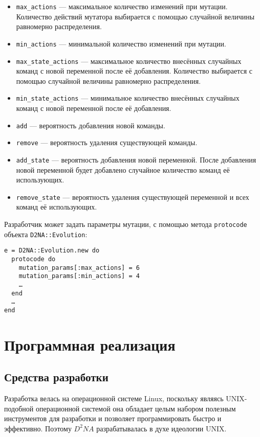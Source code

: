 \documentclass[utf8,a5paper,portrait,12pt]{eskdtext}
\begin{document}
\begin{itemize}
  \item \texttt{max\_actions} — максимальное количество изменений при мутации.
        Количество действий мутатора выбирается с помощью случайной величины
        равномерно распределения.
  \item \texttt{min\_actions} — минимальной количество изменений при мутации.
  \item \texttt{max\_state\_actions} — максимальное количество внесённых
        случайных команд с новой переменной после её добавления. Количество
        выбирается с помощью случайной величины равномерно распределения.
  \item \texttt{min\_state\_actions} — минимальное количество внесённых
        случайных команд с новой переменной после её добавления.
  \item \texttt{add} — вероятность добавления новой команды.
  \item \texttt{remove} — вероятность удаления существующей команды.
  \item \texttt{add\_state} — вероятность добавления новой переменной. После
        добавления новой переменной будет добавлено случайное количество
        команд её использующих.
  \item \texttt{remove\_state} — вероятность удаления существующей переменной и
        всех команд её использующих.
\end{itemize}

Разработчик может задать параметры мутации, с помощью метода \texttt{protocode}
объекта \texttt{D2NA::Evolution}:

\begin{verbatim}
e = D2NA::Evolution.new do
  protocode do
    mutation_params[:max_actions] = 6
    mutation_params[:min_actions] = 4
    …
  end
  …
end
\end{verbatim}

\newpage
\section{Программная реализация}

\subsection{Средства разработки}

Разработка велась на операционной системе Linux, поскольку являясь UNIX-подобной
операционной системой она обладает целым набором полезным инструментов для
разработки и позволяет программировать быстро и эффективно. Поэтому $D^2NA$
разрабатывалась в духе идеологии UNIX.
\end{document}
